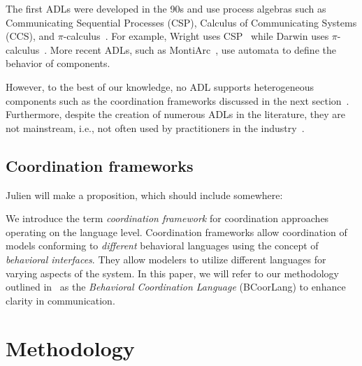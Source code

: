 \documentclass[runningheads]{llncs}
\begin{document}
The first ADLs were developed in the 90s and use process algebras such as Communicating Sequential Processes (CSP), Calculus of Communicating Systems (CCS), and $\pi$-calculus~\cite{ozkayaAreWeThere2013}.
For example, Wright uses CSP~\cite{allenFormalBasisArchitectural1997} while Darwin uses $\pi$-calculus~\cite{mageeSpecifyingDistributedSoftware1995}.
More recent ADLs, such as MontiArc~\cite{haberMontiArcArchitecturalModeling2014}, use automata to define the behavior of components.

However, to the best of our knowledge, no ADL supports heterogeneous components such as the coordination frameworks discussed in the next section~\cite{medvidovicClassificationComparisonFramework2000}.
Furthermore, despite the creation of numerous ADLs in the literature, they are not mainstream, i.e., not often used by practitioners in the industry~\cite{clementsSurveyArchitectureDescription1996,woodsArchitectureDescriptionLanguages2005,pandeyArchitecturalDescriptionLanguages2010,ozkayaAreWeThere2013,medvidovicMovingArchitecturalDescription2006}.

\subsection{Coordination frameworks} \label{subsec: frameworks}

Julien will make a proposition, which should include somewhere:

We introduce the term \textit{coordination framework} for coordination approaches operating on the language level.
Coordination frameworks allow coordination of models conforming to \textit{different} behavioral languages using the concept of \textit{behavioral interfaces}.
They allow modelers to utilize different languages for varying aspects of the system.
In this paper, we will refer to our methodology outlined in~\cite{krauterBehavioralConsistencyMultimodeling2023} as the \textit{Behavioral Coordination Language} (BCoorLang) to enhance clarity in communication.

\section{Methodology} \label{sec: methodology}
\end{document}
